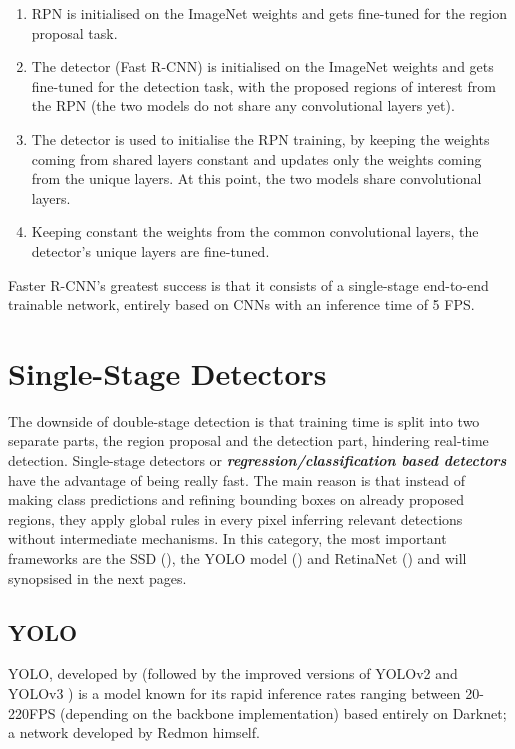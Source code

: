 \begin{enumerate}
  \item RPN is initialised on the ImageNet weights and gets fine-tuned for the region proposal task.
  \item The detector (Fast R-CNN) is initialised on the ImageNet weights and gets fine-tuned for the detection task, with the proposed regions of interest from the RPN (the two models do not share any convolutional layers yet).
  \item The detector is used to initialise the RPN training, by keeping the weights coming from shared layers constant and updates only the weights coming from the unique layers. At this point, the two models share convolutional layers.
  \item Keeping constant the weights from the common convolutional layers, the detector's unique layers are fine-tuned. 
\end{enumerate}

Faster R-CNN's greatest success is that it consists of a single-stage end-to-end trainable network, entirely based on CNNs with an inference time of 5 FPS.


\section{Single-Stage Detectors}
The downside of double-stage detection is that training time is split into two separate parts, the region proposal and the detection part, hindering real-time detection. Single-stage detectors or \textbf{\textit{regression/classification based detectors}} have the advantage of being really fast. The main reason is that instead of making class predictions and refining bounding boxes on already proposed regions, they apply global rules in every pixel inferring relevant detections without intermediate mechanisms. In this category, the most important frameworks are the SSD (\cite{liu2016ssd}), the YOLO model (\cite{redmon2016you}) and RetinaNet (\cite{lin2017focal}) and will synopsised in the next pages.
 
 \subsection{YOLO}
 YOLO, developed by \cite{redmon2016you} (followed by the improved versions of YOLOv2 \cite{redmon2017yolo9000} and YOLOv3 \cite{redmon2018yolov3}) is a model known for its rapid inference 
 rates ranging between 20-220FPS (depending on the backbone implementation) based entirely on Darknet; a network developed by Redmon himself.
 
